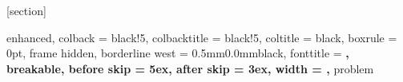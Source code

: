 \usepackage{titlesec}
\usepackage[many]{tcolorbox}
\usepackage{chngcntr}

\titlespacing*{\chapter}{0cm}{-2.0cm}{0.50cm}
\titlespacing*{\section}{0cm}{0.50cm}{0.25cm}

\setlength{\parindent}{0pt}
\setlength{\parskip}{1ex}

[section]
\renewcommand{\theproblem}{\arabic{problem}}  %

%
    {enhanced,
    colback = black!5,
    colbacktitle = black!5,
    coltitle = black,
    boxrule = 0pt,
    frame hidden,
    borderline west = {0.5mm}{0.0mm}{black},
    fonttitle = \bfseries\sffamily,
    breakable,
    before skip = 5ex,
    after skip = 3ex,
    width = \linewidth,
}{problem}

